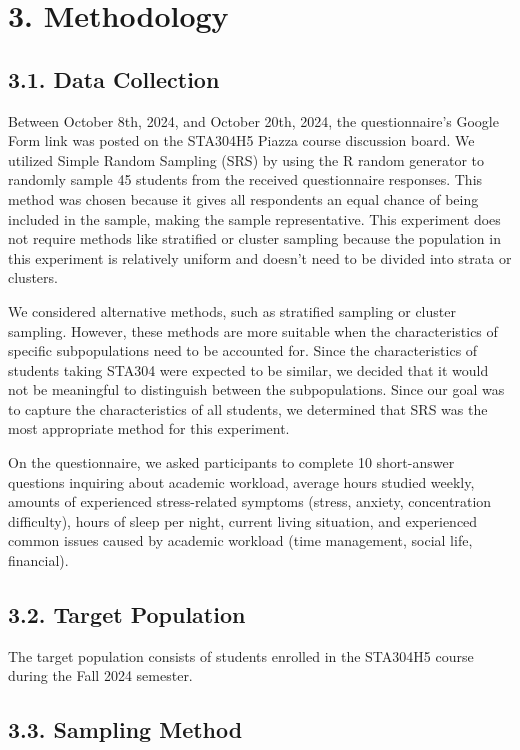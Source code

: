 \documentclass[
  letterpaper,
  DIV=11,
  numbers=noendperiod]{scrartcl}
\begin{document}
\section{3. Methodology}\label{methodology}

\subsection{3.1. Data Collection}\label{data-collection}

Between October 8th, 2024, and October 20th, 2024, the questionnaire's
Google Form link was posted on the STA304H5 Piazza course discussion
board. We utilized Simple Random Sampling (SRS) by using the R random
generator to randomly sample 45 students from the received questionnaire
responses. This method was chosen because it gives all respondents an
equal chance of being included in the sample, making the sample
representative. This experiment does not require methods like stratified
or cluster sampling because the population in this experiment is
relatively uniform and doesn't need to be divided into strata or
clusters.

We considered alternative methods, such as stratified sampling or
cluster sampling. However, these methods are more suitable when the
characteristics of specific subpopulations need to be accounted for.
Since the characteristics of students taking STA304 were expected to be
similar, we decided that it would not be meaningful to distinguish
between the subpopulations. Since our goal was to capture the
characteristics of all students, we determined that SRS was the most
appropriate method for this experiment.

On the questionnaire, we asked participants to complete 10 short-answer
questions inquiring about academic workload, average hours studied
weekly, amounts of experienced stress-related symptoms (stress, anxiety,
concentration difficulty), hours of sleep per night, current living
situation, and experienced common issues caused by academic workload
(time management, social life, financial).

\subsection{3.2. Target Population}\label{target-population}

The target population consists of students enrolled in the STA304H5
course during the Fall 2024 semester.

\subsection{3.3. Sampling Method}\label{sampling-method}
\end{document}
